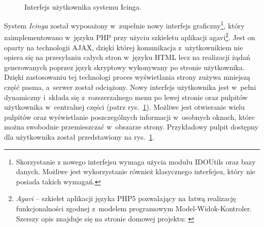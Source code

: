 \begin{figure}[ht]
\label{fig:IcingaInterface}
\caption{Interfejs użytkownika systemu Icinga.}
\begin{center}
\\[0.1cm]
\end{center}
\end{figure}

System {\em Icinga} został wyposażony w~zupełnie nowy interfejs
graficzny\footnote{Skorzystanie z nowego interfejsu wymaga użycia
  modułu IDOUtils oraz bazy danych. Możliwe jest wykorzystanie również
  klasycznego interfejsu, który nie posiada takich wymagań.}, który
zaimplementowano w~języku PHP przy użyciu szkieletu aplikacji
agavi\footnote{{\em Agavi } -- szkielet aplikacji języka PHP5
  pozwalający na łatwą realizację funkcjonalności zgodnej z~modelem
  programowym Model-Widok-Kontroler. Szerszy opis znajduje się na
  stronie domowej projektu: \cite{www:Agavi}}. Jest on oparty na
technologii AJAX, dzięki której komunikacja z~użytkownikiem nie opiera
się na przesyłaniu całych stron w~języku HTML lecz na realizacji żądań
generowanych poprzez język skryptowy wykonywany po stronie
użytkownika. Dzięki zastosowaniu tej technologi proces wyświetlania
strony zużywa mniejszą część pasma, a~serwer został odciążony. Nowy
interfejs użytkownika jest w~pełni dynamiczny i~składa się
z~rozszerzalnego menu po lewej stronie oraz pulpitów użytkownika
w~centralnej części (patrz rys.~\ref{fig:IcingaInterface}). Możliwe
jest otwieranie wielu pulpitów oraz wyświetlanie poszczególnych
informacji w~osobnych oknach, które można swobodnie przemieszczać
w~obszarze strony. Przykładowy pulpit dostępny dla użytkownika został
przedstawiony na rys.~\ref{fig:IcingaInterface}.

